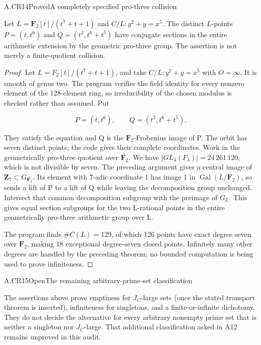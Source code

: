 \begin{claim}{A.CR14}{Proved}{A completely specified pro-three collision}

Let $L=\mathbf F_2[t]/(t^7+t+1)$ and $C/L:y^2+y=x^5$.
The distinct $L$-points
$P=(t,t^6)$ and $Q=(t^2,t^6+t^5)$ have conjugate sections in
the entire arithmetic extension by the geometric pro-three group.
The assertion is not merely a finite-quotient collision.

\end{claim}

\begin{proof}

Let \(L=F_2[t]/(t^7+t+1)\), and take \(C/L:y^2+y=x^5\) with \(O={\infty}\). It is smooth of genus two. The program verifies the field identity for every nonzero element of the 128-element ring, so irreducibility of the chosen modulus is checked rather than assumed. Put

\[P=(t,t^6),\qquad Q=(t^2,t^6+t^5).\]

They satisfy the equation and Q is the \(\mathbf{F}_2\)-Frobenius image of P. The orbit has seven distinct points; the code gives their complete coordinates. Work in the geometrically pro-three quotient over \(\mathbf{F}_2\). We have \(|GL_4(F_3)|=24\,261\,120\), which is not divisible by seven. The preceding argument gives a central image of \(\mathbf{Z}_7{\subset}G_{\mathbf{F}_2}\). Its element with 7-adic coordinate 1 has image 1 in \(\operatorname{Gal}(L/\mathbf{F}_2)\), so sends a lift of P to a lift of Q while leaving the decomposition group unchanged. Intersect that common decomposition subgroup with the preimage of \(G_L\). This gives equal section subgroups for the two L-rational points in the entire geometrically pro-three arithmetic group over L.

The program finds \(\#C(L)=129\), of which 126 points have exact degree seven over \(\mathbf{F}_2\), making 18 exceptional degree-seven closed points. Infinitely many other degrees are handled by the preceding theorem; no bounded computation is being used to prove infiniteness.


\end{proof}

\begin{claim}{A.CR15}{Open}{The remaining arbitrary-prime-set classification}

The assertions above prove emptiness for $J_C$-large sets (once
the stated transport theorem is inserted), infiniteness for
singletons, and a finite-or-infinite dichotomy. They do not decide
the alternative for every arbitrary nonempty prime set that is
neither a singleton nor $J_C$-large. That additional classification
asked in A12 remains unproved in this audit.

\end{claim}

